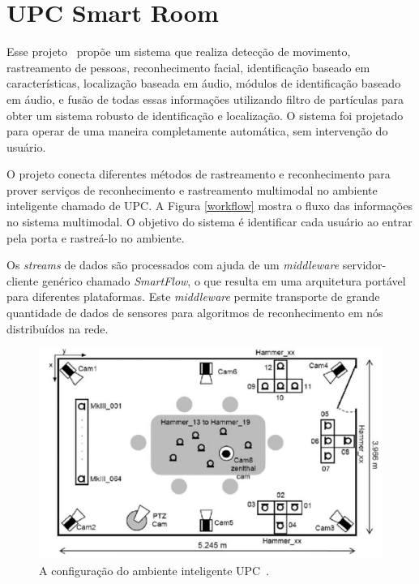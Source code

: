 
\section{UPC Smart Room}

Esse projeto~\cite{salah} propõe um sistema que realiza detecção de movimento, rastreamento de pessoas, reconhecimento facial, identificação baseado em características, localização baseada em áudio, módulos de identificação baseado em áudio, e fusão de todas essas informações utilizando filtro de partículas para obter um sistema robusto de identificação e localização. O sistema foi projetado para operar de uma maneira completamente automática, sem intervenção do usuário.

O projeto conecta diferentes métodos de rastreamento e reconhecimento para prover serviços de reconhecimento e rastreamento multimodal no ambiente inteligente chamado de UPC.  A Figura \ref{workflow} mostra o fluxo das informações no sistema multimodal. O objetivo do sistema é identificar cada usuário ao entrar pela porta e rastreá-lo no ambiente. 

Os \textit{streams} de dados são processados com ajuda de um \textit{middleware} servidor-cliente genérico chamado \textit{SmartFlow}, o que resulta em uma arquitetura portável para diferentes plataformas. Este \textit{middleware} permite transporte de grande quantidade de dados de sensores para algoritmos de reconhecimento em nós distribuídos na rede.

	\begin{figure}[hbt]
		\begin{center}
			\includegraphics[scale=0.4]{figuras/3.TrabalhosCorrelatos/upc.png}
		\end{center}
		\caption{A configuração do ambiente inteligente UPC~\cite{salah}.}
		\label{upc}
	\end{figure}

